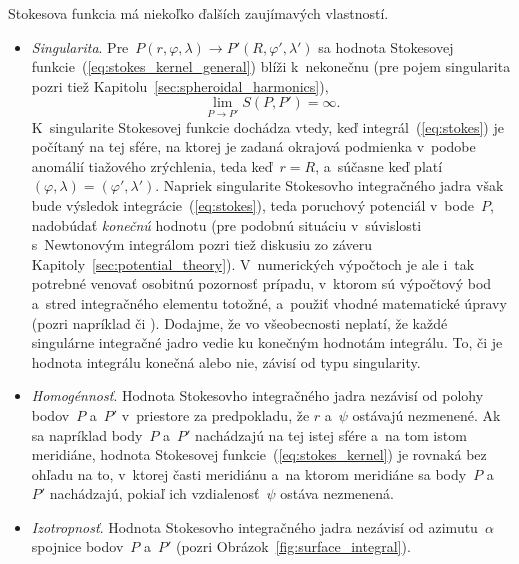 \documentclass[a4paper, 12pt]{book}
\begin{document}
Stokesova funkcia má niekoľko ďalších zaujímavých vlastností.
%
\begin{itemize}
\item \emph{Singularita}.  Pre~$P(r, \varphi, \lambda) \rightarrow P'(R, 
\varphi', \lambda')$ sa hodnota Stokesovej 
funkcie~(\ref{eq:stokes_kernel_general}) blíži k~nekonečnu (pre pojem 
singularita pozri tiež Kapitolu~\ref{sec:spheroidal_harmonics}),
%
\begin{equation}
\label{eq:stokes_singularity}
\lim\limits_{P \rightarrow P'} S(P, P') = \infty{.}
\end{equation}
%
K~singularite Stokesovej funkcie dochádza vtedy, keď integrál~(\ref{eq:stokes}) 
je počítaný na tej sfére, na ktorej je zadaná okrajová podmienka v~podobe 
anomálií tiažového zrýchlenia, teda keď~$r = R$, a~súčasne keď platí~$(\varphi, 
\lambda) = (\varphi', \lambda')$.  Napriek singularite Stokesovho integračného 
jadra však bude výsledok integrácie~(\ref{eq:stokes}), teda poruchový potenciál 
v~bode~$P$, nadobúdať \emph{konečnú} hodnotu (pre podobnú situáciu v~súvislosti 
s~Newtonovým integrálom pozri tiež diskusiu zo záveru 
Kapitoly~\ref{sec:potential_theory}).  V~numerických výpočtoch je ale i~tak 
potrebné venovať osobitnú pozornosť prípadu, v~ktorom sú výpočtový bod a~stred 
integračného elementu totožné, a~použiť vhodné matematické úpravy (pozri 
napríklad \cite{MoritzPhysicalGeodesy} či \cite{Hees1991}).  Dodajme, že vo 
všeobecnosti neplatí, že každé singulárne integračné jadro vedie ku konečným 
hodnotám integrálu.  To, či je hodnota integrálu konečná alebo nie, závisí od 
typu singularity.
%
\item \emph{Homogénnosť}.  Hodnota Stokesovho integračného jadra nezávisí od 
polohy bodov~$P$ a~$P'$ v~priestore za predpokladu, že $r$ a~$\psi$ ostávajú 
nezmenené.  Ak sa napríklad body~$P$ a~$P'$ nachádzajú na tej istej sfére a~na 
tom istom meridiáne, hodnota Stokesovej funkcie~(\ref{eq:stokes_kernel}) je 
rovnaká bez ohľadu na to, v~ktorej časti meridiánu a~na ktorom meridiáne sa 
body~$P$ a~$P'$ nachádzajú, pokiaľ ich vzdialenosť~$\psi$ ostáva nezmenená.
%
\item \emph{Izotropnosť}.  Hodnota Stokesovho integračného jadra nezávisí od 
azimutu~$\alpha$ spojnice bodov~$P$ a~$P'$ (pozri 
Obrázok~\ref{fig:surface_integral}).
\end{itemize}
\end{document}
